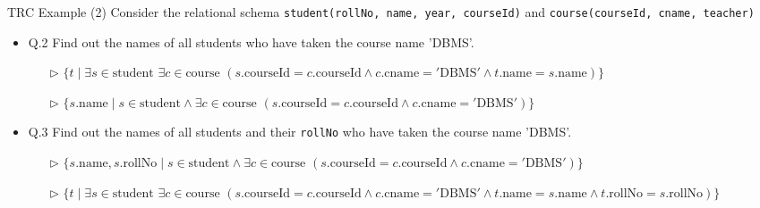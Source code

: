 \documentclass[aspectratio=169, xcolor=dvipsnames]{beamer}
\begin{document}
\begin{frame}{TRC Example (2)}
    Consider the relational schema \texttt{student(rollNo, name, year, courseId)} and \texttt{course(courseId, cname, teacher)}
    \begin{itemize}[<+->]
        \item Q.2 Find out the names of all students who have taken the course name 'DBMS'.
        \begin{itemize}
            \item[$\triangleright$] $\{t \mid \exists s \in \text{student } \exists c \in \text{course } (s.\text{courseId} = c.\text{courseId} \land c.\text{cname} = '\text{DBMS}' \land t.\text{name} = s.\text{name})\}$
            \item[$\triangleright$] $\{s.\text{name} \mid s \in \text{student} \land \exists c \in \text{course } (s.\text{courseId} = c.\text{courseId} \land c.\text{cname} = '\text{DBMS}')\}$
        \end{itemize}
        \item Q.3 Find out the names of all students and their \texttt{rollNo} who have taken the course name 'DBMS'.
        \begin{itemize}
            \item[$\triangleright$] $\{s.\text{name}, s.\text{rollNo} \mid s \in \text{student} \land \exists c \in \text{course } (s.\text{courseId} = c.\text{courseId} \land c.\text{cname} = '\text{DBMS}')\}$
            \item[$\triangleright$] $\{t \mid \exists s \in \text{student } \exists c \in \text{course } (s.\text{courseId} = c.\text{courseId} \land c.\text{cname} = '\text{DBMS}' \land t.\text{name} = s.\text{name} \land t.\text{rollNo} = s.\text{rollNo})\}$
        \end{itemize}
    \end{itemize}
\end{frame}
\end{document}
